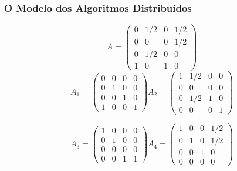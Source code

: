 \documentclass{beamer}
\begin{document}
\begin{frame}
	\frametitle{O Modelo dos Algoritmos Distribuídos}

\begin{equation}
A = \begin{pmatrix}
 0 & 1/2 & 0 & 1/2 \\
 0 &  0  & 0 & 1/2 \\
 0 & 1/2 & 0 &  0  \\
 1 &  0  & 1 &  0
\end{pmatrix}
\end{equation}
\vspace{0.4cm}
\begin{equation}\nonumber
A_1 = \begin{pmatrix}
 0 &  0  & 0 &  0 \\
 0 &  1  & 0 &  0 \\
 0 &  0  & 1 &  0  \\
 1 &  0  & 0 &  1
\end{pmatrix}
%
A_2 = \begin{pmatrix}
 1 & 1/2 & 0 &  0 \\
 0 &  0  & 0 &  0 \\
 0 & 1/2 & 1 &  0  \\
 0 &  0  & 0 &  1
\end{pmatrix}
\end{equation}

\begin{equation}\nonumber
A_3 = \begin{pmatrix}
 1 &  0  & 0 &  0 \\
 0 &  1  & 0 &  0 \\
 0 &  0  & 0 &  0  \\
 0 &  0  & 1 &  1
\end{pmatrix}
%
A_4 = \begin{pmatrix}
 1 &  0  & 0 & 1/2 \\
 0 &  1  & 0 & 1/2 \\
 0 &  0  & 1 &  0  \\
 0 &  0  & 0 &  0
\end{pmatrix}
\end{equation}	
	
\end{frame}
\end{document}
